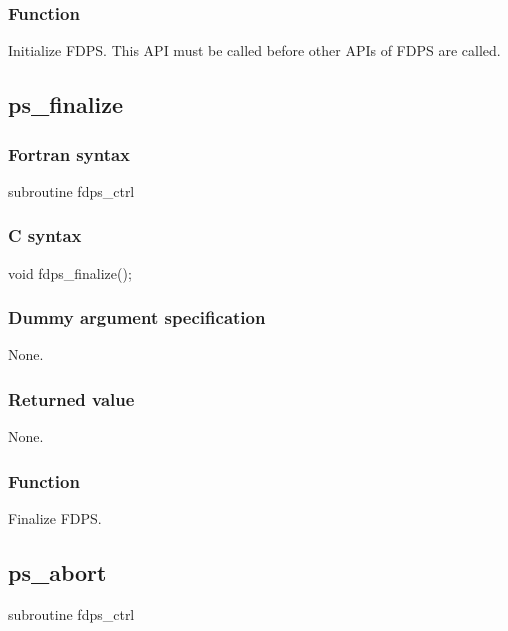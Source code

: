 \subsubsection*{Function}
Initialize FDPS. This API must be called before other APIs of FDPS are called.
\clearpage

\subsection{ps\_finalize}
\subsubsection*{Fortran syntax}
\begin{screen}
\begin{spverbatim}
subroutine fdps_ctrl%
\end{spverbatim}
\end{screen}

\subsubsection*{C syntax}
\begin{screen}
\begin{spverbatim}
void fdps_finalize();
\end{spverbatim}
\end{screen}

\subsubsection*{Dummy argument specification} 
None.

\subsubsection*{Returned value}
None.

\subsubsection*{Function}
Finalize FDPS.
\clearpage

\subsection{ps\_abort}
\begin{screen}
\begin{spverbatim}
subroutine fdps_ctrl%
\end{spverbatim}
\end{screen}

